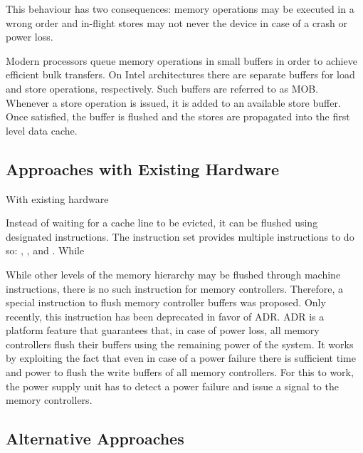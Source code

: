 This behaviour has two consequences: memory operations may be executed in a
wrong order and in-flight stores may not never the device in case of a crash
or power loss.

Modern processors queue memory operations in small buffers in order to achieve
efficient bulk transfers. On Intel  architectures there are separate
buffers for load and store operations, respectively. Such buffers are referred
to as MOB. Whenever a store operation is issued, it is added to an
available store buffer. Once satisfied, the buffer is flushed and the stores are
propagated into the first level data cache.

\subsection{Approaches with Existing Hardware}

With existing hardware


Instead of waiting for a cache line to be evicted, it can be flushed using
designated instructions. The  instruction set provides multiple
instructions to do so: , , and .
While 


While other levels of the memory hierarchy may be flushed through machine
instructions, there is no such instruction for memory controllers. Therefore,
 a special instruction to flush memory controller buffers was
proposed. Only recently, this instruction has been deprecated in favor of
ADR. ADR is a platform feature that guarantees that, in case of power
loss, all memory controllers flush their buffers using the remaining power of
the system. It works by exploiting the fact that even in case of a power failure
there is sufficient time and power to flush the write buffers of all memory
controllers. For this to work, the power supply unit has to detect a power
failure and issue a signal to the memory controllers.

\subsection{Alternative Approaches}

